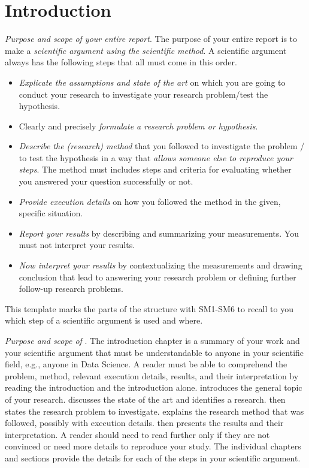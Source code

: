 \chapter{Introduction}\label{sec:introduction}

\emph{Purpose and scope of your entire report}.
The purpose of your entire report is to make a \emph{scientific argument using the scientific method}.
A scientific argument always has the following steps that all must come in this order.
%
\begin{itemize}
  \item[SM1] \emph{Explicate the assumptions and state of the art} on which you are going to conduct your research to investigate your research problem/test the hypothesis.
  \item[SM2] Clearly and precisely \emph{formulate a research problem or hypothesis}.
  \item[SM3] \emph{Describe the (research) method} that you followed to investigate the problem / to test the hypothesis in a way that \emph{allows someone else to reproduce your steps}.
        The method must includes steps and criteria for evaluating whether you answered your question successfully or not.
  \item[SM4] \emph{Provide execution details} on how you followed the method in the given, specific situation.
  \item[SM5] \emph{Report your results} by describing and summarizing your measurements.
        You must not interpret your results.
  \item[SM6] \emph{Now interpret your results} by contextualizing the measurements and drawing conclusion that lead to answering your research problem or defining further follow-up research problems.
\end{itemize}
%
This template marks the parts of the structure with SM1-SM6 to recall to you which step of a scientific argument is used and where.

\emph{Purpose and scope of }.
The introduction chapter is a summary of your work and your scientific argument that must be understandable to anyone in your scientific field, e.g., anyone in Data Science.
A reader must be able to comprehend the problem, method, relevant execution details, results, and their interpretation by reading the introduction and the introduction alone.
 introduces the general topic of your research.
 discusses the state of the art and identifies a research.
 then states the research problem to investigate.
 explains the research method that was followed, possibly with execution details.
 then presents the results and their interpretation.
A reader should need to read further only if they are not convinced or need more details to reproduce your study.
The individual chapters and sections provide the details for each of the steps in your scientific argument.

